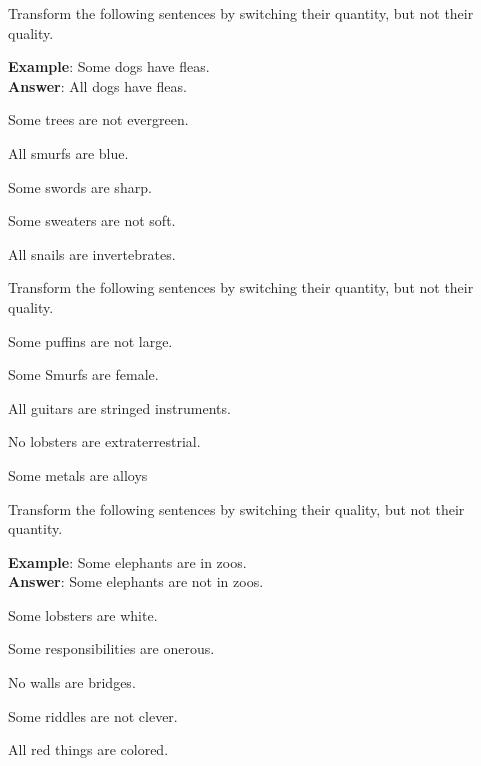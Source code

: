 \noindent\problempart Transform the following sentences by switching their quantity, but not their quality.

\textbf{Example}: Some dogs have fleas. \\
\textbf{Answer}: All dogs have fleas.

\begin{exercises}
\item Some trees are not evergreen. 
\item All smurfs are blue. 
\item Some swords are sharp. 
\item Some sweaters are not soft. 
\item All snails are invertebrates. 
\end{exercises}

\noindent\problempart Transform the following sentences by switching their quantity, but not their quality.

\begin{exercises}
\item Some puffins are not large.
\item Some Smurfs are female.
\item All guitars are stringed instruments.
\item No lobsters are extraterrestrial.
\item Some metals are alloys
\end{exercises}

\noindent\problempart Transform the following sentences by switching their quality, but not their quantity.

\textbf{Example}: Some elephants are in zoos. \\
\textbf{Answer}: Some elephants are not in zoos.

\begin{exercises}
\item Some lobsters are white. 

\item Some responsibilities are onerous. 

\item No walls are bridges. 

\item Some riddles are not clever.

\item All red things are colored. 
\end{exercises}

